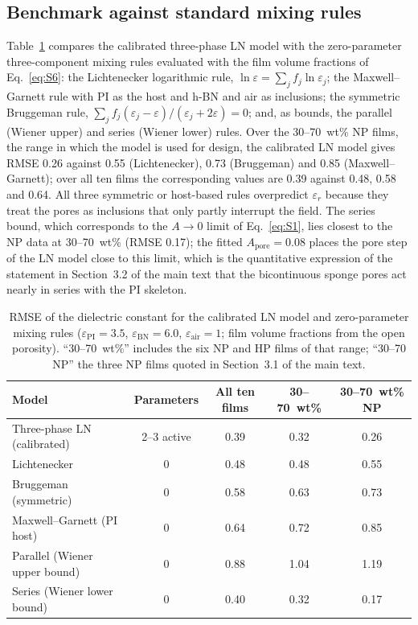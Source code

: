 \documentclass[10pt,a4paper]{article}
\newcommand{\eps}{\ensuremath{\varepsilon_r}}
\newcommand{\Apore}{\ensuremath{A_{\mathrm{pore}}}}
\begin{document}
\subsection{Benchmark against standard mixing rules}
\label{si:mixingrules}
Table~\ref{tab:S4} compares the calibrated three-phase LN model with the zero-parameter three-component mixing rules evaluated with the film volume fractions of Eq.~\ref{eq:S6}: the Lichtenecker logarithmic rule, $\ln\varepsilon = \sum_j f_j \ln\varepsilon_j$; the Maxwell--Garnett rule with PI as the host and h-BN and air as inclusions; the symmetric Bruggeman rule, $\sum_j f_j(\varepsilon_j - \varepsilon)/(\varepsilon_j + 2\varepsilon) = 0$; and, as bounds, the parallel (Wiener upper) and series (Wiener lower) rules. Over the 30--70~wt\% NP films, the range in which the model is used for design, the calibrated LN model gives RMSE 0.26 against 0.55 (Lichtenecker), 0.73 (Bruggeman) and 0.85 (Maxwell--Garnett); over all ten films the corresponding values are 0.39 against 0.48, 0.58 and 0.64. All three symmetric or host-based rules overpredict \eps{} because they treat the pores as inclusions that only partly interrupt the field. The series bound, which corresponds to the $A \to 0$ limit of Eq.~\ref{eq:S1}, lies closest to the NP data at 30--70~wt\% (RMSE 0.17); the fitted $\Apore = 0.08$ places the pore step of the LN model close to this limit, which is the quantitative expression of the statement in Section~3.2 of the main text that the bicontinuous sponge pores act nearly in series with the PI skeleton.

\begin{table}[htbp]
\centering
\caption{RMSE of the dielectric constant for the calibrated LN model and zero-parameter mixing rules ($\varepsilon_{\mathrm{PI}} = 3.5$, $\varepsilon_{\mathrm{BN}} = 6.0$, $\varepsilon_{\mathrm{air}} = 1$; film volume fractions from the open porosity). ``30--70~wt\%'' includes the six NP and HP films of that range; ``30--70 NP'' the three NP films quoted in Section~3.1 of the main text.}
\label{tab:S4}
\small
\begin{tabular}{@{}lcccc@{}}
\toprule
Model & Parameters & All ten films & 30--70~wt\% & 30--70~wt\% NP \\
\midrule
Three-phase LN (calibrated) & 2--3 active & 0.39 & 0.32 & 0.26 \\
Lichtenecker                & 0 & 0.48 & 0.48 & 0.55 \\
Bruggeman (symmetric)       & 0 & 0.58 & 0.63 & 0.73 \\
Maxwell--Garnett (PI host)  & 0 & 0.64 & 0.72 & 0.85 \\
Parallel (Wiener upper bound) & 0 & 0.88 & 1.04 & 1.19 \\
Series (Wiener lower bound)   & 0 & 0.40 & 0.32 & 0.17 \\
\bottomrule
\end{tabular}
\end{table}
\end{document}

